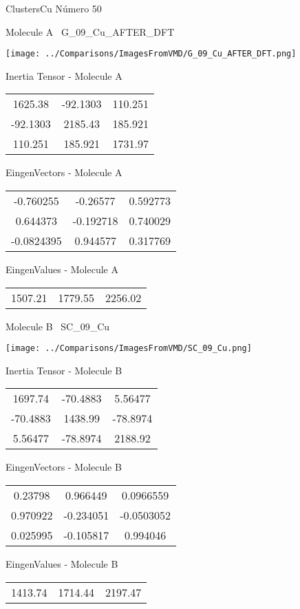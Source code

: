 \vtab[-3cm]
\begin{center}
{\large ClustersCu \tab Número 50}
\end{center}
\begin{multicols}{2}
\begin{center}

Molecule A \
G\_09\_Cu\_AFTER\_DFT

\texttt{[image: ../Comparisons/ImagesFromVMD/G\_09\_Cu\_AFTER\_DFT.png]}

Inertia Tensor - Molecule A \\
\begin{tabular}{|c c c|}
1625.38	 & 	-92.1303	 & 	110.251	 \\
-92.1303	 & 	2185.43	 & 	185.921	 \\
110.251	 & 	185.921	 & 	1731.97
\end{tabular}

\vtab
 EingenVectors - Molecule A     \\
\begin{tabular}{|c c c|}
-0.760255	 & 	-0.26577	 & 	0.592773	 \\
0.644373	 & 	-0.192718	 & 	0.740029	 \\
-0.0824395	 & 	0.944577	 & 	0.317769
\end{tabular}

\vtab
 EingenValues - Molecule A     \\
\begin{tabular}{|c c c|}
1507.21	 & 	1779.55	 & 	2256.02	 \\
\end{tabular}
\columnbreak

Molecule B \
SC\_09\_Cu

\texttt{[image: ../Comparisons/ImagesFromVMD/SC\_09\_Cu.png]}

Inertia Tensor - Molecule B \\
\begin{tabular}{|c c c|}
1697.74	 & 	-70.4883	 & 	5.56477	 \\
-70.4883	 & 	1438.99	 & 	-78.8974	 \\
5.56477	 & 	-78.8974	 & 	2188.92
\end{tabular}

\vtab
 EingenVectors - Molecule B     \\
\begin{tabular}{|c c c|}
0.23798	 & 	0.966449	 & 	0.0966559	 \\
0.970922	 & 	-0.234051	 & 	-0.0503052	 \\
0.025995	 & 	-0.105817	 & 	0.994046
\end{tabular}

\vtab
 EingenValues - Molecule B     \\
\begin{tabular}{|c c c|}
1413.74	 & 	1714.44	 & 	2197.47	 \\
\end{tabular}

\end{center}
\end{multicols}

